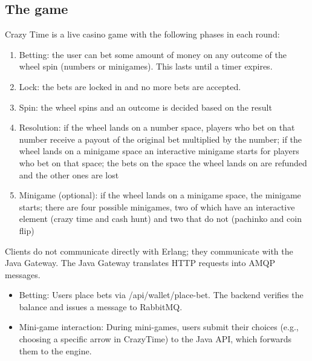 \documentclass[12pt,a4paper]{article}
\begin{document}
\subsection{The game}
Crazy Time is a live casino game with the following phases in each round:
\begin{enumerate}
    \item Betting: the user can bet some amount of money on any outcome of the wheel spin (numbers or minigames). This lasts until a timer expires.
    \item Lock: the bets are locked in and no more bets are accepted.
    \item Spin: the wheel spins and an outcome is decided based on the result
    \item Resolution: if the wheel lands on a number space, players who bet on that number receive a payout of the original bet multiplied by the number; if the wheel lands on a minigame space an interactive minigame starts for players who bet on that space; the bets on the space the wheel lands on are refunded and the other ones are lost
    \item Minigame (optional): if the wheel lands on a minigame space, the minigame starts; there are four possible minigames, two of which have an interactive element (crazy time and cash hunt) and two that do not (pachinko and coin flip)
\end{enumerate}

Clients do not communicate directly with Erlang; they communicate with the Java Gateway. The Java Gateway translates HTTP requests into AMQP messages.
\begin{itemize}
    \item Betting: Users place bets via /api/wallet/place-bet. The backend verifies the balance and issues a message to RabbitMQ.
    \item Mini-game interaction: During mini-games, users submit their choices (e.g., choosing a specific arrow in CrazyTime) to the Java API, which forwards them to the engine.
\end{itemize}
\end{document}
